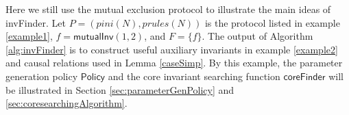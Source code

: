\documentclass[conference]{IEEEtran}
\newcommand\lyj[1]{\textcolor{magenta}{#1}}
\newcommand\caicomment[1]{\textcolor{blue}{comment: #1} }
\begin{document}
{%



 Here we still use the mutual exclusion protocol to illustrate the main ideas of {\sf invFinder}. Let $ P=(pini(N),prules(N))$ is the protocol listed in example \ref{example1}, $f=\mathsf{mutualInv}(1,2)$, and $F=\{f\}$. The output of Algorithm \ref{alg:invFinder} is to construct  useful
auxiliary invariants in example \ref{example2} and causal relations used in Lemma \ref{caseSimp}. By this example,  the parameter generation policy $\mathsf{Policy}$  and the core invariant searching function $\mathsf{coreFinder}$ will be illustrated in Section \ref{sec:parameterGenPolicy} and \ref{sec:coresearchingAlgorithm}.

\vspace{-5pt}

}
\end{document}
